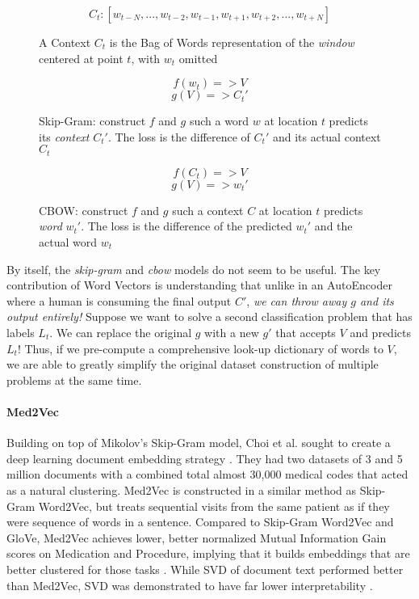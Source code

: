 \begin{figure}
\[ C_t: [w_{t-N}, ..., w_{t-2}, w_{t-1}, w_{t+1}, w_{t+2}, ..., w_{t+N}] \]
\caption{A Context $C_t$ is the Bag of Words representation of the \textit{window} centered at point $t$, with $w_t$ omitted}
\end{figure}


\begin{figure}
\[ f(w_t) => V \]
\[ g(V) => C_t' \]
\caption{Skip-Gram: construct $f$ and $g$ such a word $w$ at location $t$ predicts its \textit{context} $C_t'$. The loss is the difference of $C_t'$ and its actual context $C_t$}
\end{figure}

\begin{figure}
\[ f(C_t) => V \]
\[ g(V) => w_t' \]
\caption{CBOW: construct $f$ and $g$ such a context $C$ at location $t$ predicts \textit{word} $w_t'$. The loss is the difference of the predicted $w_t'$ and the actual word $w_t$}
\end{figure}

\par{
By itself, the \textit{skip-gram} and \textit{cbow} models do not seem to be useful. The key contribution of Word Vectors is understanding that unlike in an AutoEncoder where a human is consuming the final output $C'$, \textit{we can throw away $g$ and its output entirely!} Suppose we want to solve a second classification problem that has labels $L_t$. We can replace the original $g$ with a new $g'$ that accepts $V$ and predicts $L_t$! Thus, if we pre-compute a comprehensive look-up dictionary of words to $V$, we are able to greatly simplify the original dataset construction of multiple problems at the same time. 
}

\paragraph{Med2Vec} Building on top of Mikolov's Skip-Gram model, Choi et al. sought to create a deep learning document embedding strategy \cite{med2vec}. They had two datasets of 3 and 5 million documents with a combined total almost 30,000 medical codes that acted as a natural clustering. \textsf{Med2Vec} is constructed in a similar method as \textsf{Skip-Gram Word2Vec}, but treats sequential visits from the same patient as if they were sequence of words in a sentence. Compared to \textsf{Skip-Gram Word2Vec} and \textsf{GloVe}, \textsf{Med2Vec} achieves lower, better normalized Mutual Information Gain scores on Medication and Procedure, implying that it builds embeddings that are better clustered for those tasks \cite{GloVe}. While \textsf{SVD} of document text performed better than \textsf{Med2Vec}, \textsf{SVD} was demonstrated to have far lower interpretability \cite{svd}. 

